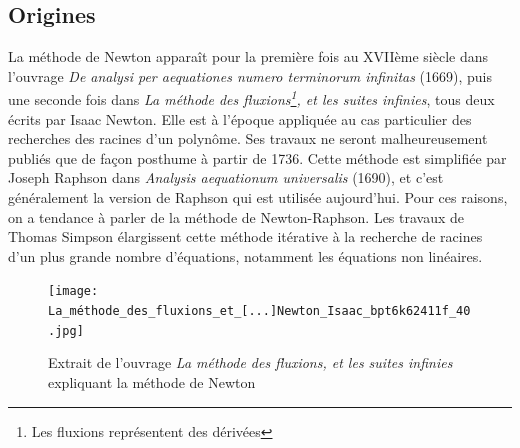 \documentclass[3p, twocolumn]{elsarticle}
\begin{document}
\subsection{Origines}
La méthode de Newton apparaît pour la première fois au XVIIème siècle dans l'ouvrage \emph{De analysi per aequationes numero terminorum infinitas} (1669), puis une seconde fois dans \textit{La méthode des fluxions\footnote{Les fluxions représentent des dérivées}, et les suites infinies}\cite{book:newtonfluxions}, tous deux écrits par Isaac Newton. Elle est à l'époque appliquée au cas particulier des recherches des racines d'un polynôme. Ses travaux ne seront malheureusement publiés que de façon posthume à partir de 1736. Cette méthode est simplifiée par Joseph Raphson dans \textit{Analysis aequationum universalis} (1690), et c'est généralement la version de Raphson qui est utilisée aujourd'hui. Pour ces raisons, on a tendance à parler de la méthode de Newton-Raphson. Les travaux de Thomas Simpson élargissent cette méthode itérative à la recherche de racines d'un plus grande nombre d'équations, notamment les équations non linéaires.
\begin{figure}[htbp]
    \centering
    \texttt{[image: La\_méthode\_des\_fluxions\_et\_[...]Newton\_Isaac\_bpt6k62411f\_40.jpg]}
    \caption{Extrait de l'ouvrage \textit{La méthode
            des fluxions, et les suites infinies} expliquant la méthode de Newton}
    \label{fig:fluxion_newton_method}
\end{figure}
\end{document}
